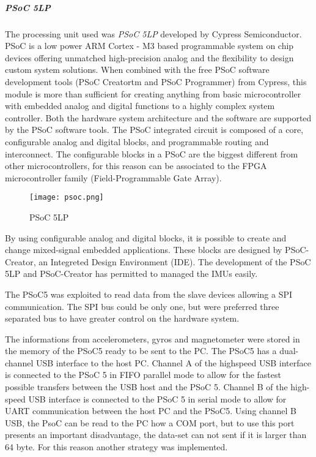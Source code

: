 \subparagraph{PSoC 5LP}

\noindent The processing unit used was \textit{PSoC 5LP} developed by  Cypress Semiconductor. PSoC is a low power  ARM \textsuperscript \textregistered Cortex - M3 based programmable system on chip devices offering unmatched high-precision analog and the flexibility to design custom system solutions. When combined with the free PSoC software development tools (PSoC Creatortm and
PSoC Programmer) from Cypress, this module is more than sufficient for creating anything from basic microcontroller with embedded analog and digital functions to a highly complex system controller. Both the hardware system architecture and the software are supported by the PSoC
software tools. 
The PSoC integrated circuit is composed of a core, configurable analog and digital blocks, and programmable routing and interconnect. The configurable blocks in a PSoC are the biggest different from other microcontrollers, for this reason can be associated to the FPGA microcontroller family (Field-Programmable Gate Array). 
\begin{figure}[h]
\centering
\texttt{[image: psoc.png]}
\caption{PSoC 5LP}
\label{fig:psoc}
\end{figure}

By using configurable analog and digital blocks, it is possible to  create and change mixed-signal embedded applications. These blocks are designed by PSoC-Creator, an Integreted Design Environment (IDE).  
The development of the PSoC 5LP  and PSoC-Creator has permitted to managed  the IMUs easily. 

The PSoC5 was exploited to read data from the slave devices allowing a SPI communication. The SPI bus could be only one, but were preferred three separated bus to have greater control on the hardware system. 

The informations from accelerometers, gyros and magnetometer were stored in the  memory of the PSoC5 ready to be sent to the PC.  The PSoC5 has a dual-channel USB interface to the host PC. Channel A of the highspeed USB interface is connected to the PSoC 5 in FIFO parallel mode to allow for the fastest possible transfers between the USB host and the PSoC 5. Channel B of the high-speed USB interface is connected to the PSoC 5 in serial mode to allow for UART communication between the host PC and the PSoC5. Using channel B USB, the PsoC can be read to the PC how a COM port, but to use this port presents an important disadvantage, the data-set can not sent if it is larger than 64 byte. For this reason another strategy was implemented. \\
\newline

